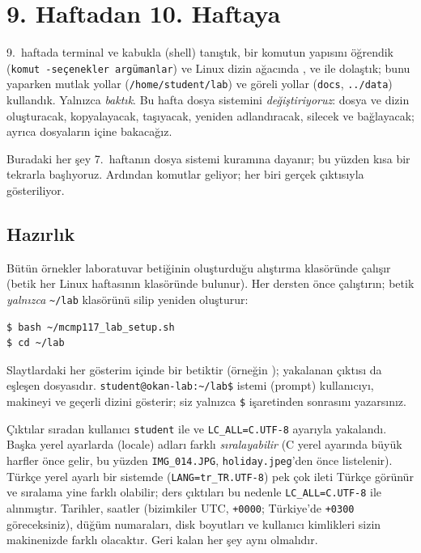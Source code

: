 \setcounter{tocdepth}{1}
\tableofcontents

\section{9. Haftadan 10. Haftaya}

9.~haftada terminal ve kabukla (shell) tanıştık, bir komutun yapısını öğrendik (\texttt{komut}\ \texttt{-seçenekler}\ \texttt{argümanlar}) ve Linux dizin ağacında ,  ve  ile dolaştık; bunu yaparken mutlak yollar (\texttt{/home/\allowbreak student/\allowbreak lab}) ve göreli yollar (\texttt{docs}, \texttt{../data}) kullandık. Yalnızca \emph{baktık}. Bu hafta dosya sistemini \emph{değiştiriyoruz}: dosya ve dizin oluşturacak, kopyalayacak, taşıyacak, yeniden adlandıracak, silecek ve bağlayacak; ayrıca dosyaların içine bakacağız.

Buradaki her şey 7.~haftanın dosya sistemi kuramına dayanır; bu yüzden kısa bir tekrarla başlıyoruz. Ardından komutlar geliyor; her biri gerçek çıktısıyla gösteriliyor.

\subsection*{Hazırlık}

Bütün örnekler laboratuvar betiğinin oluşturduğu alıştırma klasöründe çalışır (betik her Linux haftasının  klasöründe bulunur). Her dersten önce çalıştırın; betik \emph{yalnızca} \texttt{\textasciitilde/lab} klasörünü silip yeniden oluşturur:
\begin{lstlisting}[style=term]
$ bash ~/mcmp117_lab_setup.sh
$ cd ~/lab
\end{lstlisting}
Slaytlardaki her gösterim  içinde bir betiktir (örneğin ); yakalanan çıktısı da eşleşen  dosyasıdır. \texttt{student@okan-lab:\textasciitilde/lab\$} istemi (prompt) kullanıcıyı, makineyi ve geçerli dizini gösterir; siz yalnızca \texttt{\$} işaretinden sonrasını yazarsınız.

\begin{keyidea}
Çıktılar sıradan kullanıcı \texttt{student} ile ve \texttt{LC\_ALL=C.UTF-8} ayarıyla yakalandı. Başka yerel ayarlarda (locale)  adları farklı \emph{sıralayabilir} (C yerel ayarında büyük harfler önce gelir, bu yüzden \texttt{IMG\_014.JPG}, \texttt{holiday.jpeg}'den önce listelenir). Türkçe yerel ayarlı bir sistemde (\texttt{LANG=tr\_TR.UTF-8}) pek çok ileti Türkçe görünür ve sıralama yine farklı olabilir; ders çıktıları bu nedenle \texttt{LC\_ALL=C.UTF-8} ile alınmıştır. Tarihler, saatler (bizimkiler UTC, \texttt{+0000}; Türkiye'de \texttt{+0300} göreceksiniz), düğüm numaraları, disk boyutları ve kullanıcı kimlikleri sizin makinenizde farklı olacaktır. Geri kalan her şey aynı olmalıdır.
\end{keyidea}


